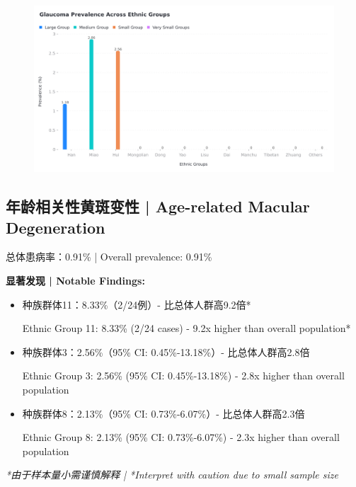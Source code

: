 \documentclass[12pt,a4paper]{article}
\begin{document}
\begin{figure}[H]
\hspace{-2cm}
\includegraphics[width=1.2\textwidth]{all/interactive_chart_glaucoma.png}

\end{figure}

\subsection{年龄相关性黄斑变性 | Age-related Macular Degeneration}

总体患病率：0.91\% | Overall prevalence: 0.91\%

\textbf{显著发现 | Notable Findings:}
\begin{itemize}
    \item 种族群体11：8.33\%（2/24例）- 比总体人群高9.2倍*
    
    Ethnic Group 11: 8.33\% (2/24 cases) - 9.2x higher than overall population*
    
    \item 种族群体3：2.56\%（95\% CI: 0.45\%-13.18\%）- 比总体人群高2.8倍
    
    Ethnic Group 3: 2.56\% (95\% CI: 0.45\%-13.18\%) - 2.8x higher than overall population
    
    \item 种族群体8：2.13\%（95\% CI: 0.73\%-6.07\%）- 比总体人群高2.3倍
    
    Ethnic Group 8: 2.13\% (95\% CI: 0.73\%-6.07\%) - 2.3x higher than overall population
\end{itemize}

\textit{*由于样本量小需谨慎解释 | *Interpret with caution due to small sample size}
\end{document}
